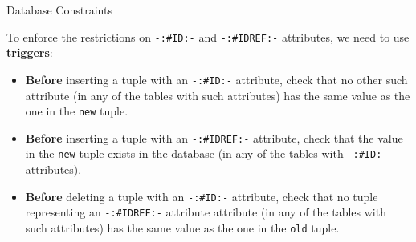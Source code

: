 
\begin{frame}[fragile]{Database Constraints}

To enforce the restrictions on \lstinline[language=DTD]!-:#ID:-! and \lstinline[language=DTD]!-:#IDREF:-! attributes, we need to use \textbf{triggers}:

\begin{itemize}[-,topsep=-5pt]
\item \alert{\textbf{Before} inserting} a tuple with an \lstinline[language=DTD]!-:#ID:-! attribute, check that no other such attribute (in any of the tables with such attributes) has the same value as the one in the \lstinline[style=SQL]!new! tuple.
\item \alert{\textbf{Before} inserting} a tuple with an \lstinline[language=DTD]!-:#IDREF:-! attribute, check that the value in the \lstinline[style=SQL]!new! tuple exists in the database (in any of the tables with \lstinline[language=DTD]!-:#ID:-! attributes).
\item \alert{\textbf{Before} deleting} a tuple with an \lstinline[language=DTD]!-:#ID:-! attribute, check that no tuple representing an \lstinline[language=DTD]!-:#IDREF:-! attribute attribute (in any of the tables with such attributes) has the same value as the one in the \lstinline[style=SQL]!old! tuple.
\end{itemize} 
\end{frame}


